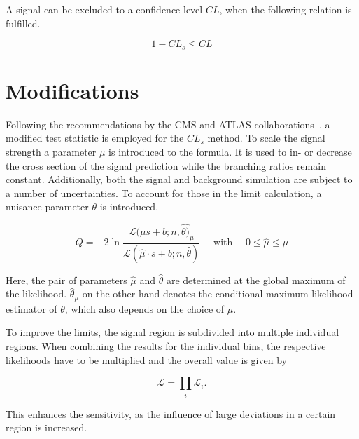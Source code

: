 A signal can be excluded to a confidence level $CL$, when the following relation is fulfilled.

\begin{equation}
  \label{eq:cl-excl}
  1 - CL_s \leq CL
\end{equation}

\section{Modifications}
\label{sec:mods}

Following the recommendations by the CMS and ATLAS collaborations~\cite{clsmod}, a modified test statistic is employed for the $CL_s$ method. To scale the signal strength a parameter $\mu$ is introduced to the formula. It is used to in- or decrease the cross section of the signal prediction while the branching ratios remain constant. Additionally, both the signal and background simulation are subject to a number of uncertainties. To account for those in the limit calculation, a nuisance parameter $\theta$ is introduced.

\begin{equation}
  \label{eq:q-mod}
  Q = - 2 \ln{ \frac{\mathcal{L} (\mu s + b; n, \hat{\theta)}_\mu }{\mathcal{L} (\hat{\mu} \cdot s + b; n, \hat{\theta} )} } \quad \text{ with } \quad 0 \leq \hat{\mu} \leq \mu
\end{equation}

\noindent Here, the pair of parameters $\hat{\mu}$ and $\hat{\theta}$ are determined at the global maximum of the likelihood. $\hat{\theta}_\mu$ on the other hand denotes the conditional maximum likelihood estimator of $\theta$, which also depends on the choice of $\mu$.


To improve the limits, the signal region is subdivided into multiple individual regions. When combining the results for the individual bins, the respective likelihoods have to be multiplied and the overall value is given by

\begin{equation}
  \label{eq:likelihood-product}
  \mathcal{L} = \prod_i \mathcal{L}_i.
\end{equation}

\noindent This enhances the sensitivity, as the influence of large deviations in a certain region is increased.

